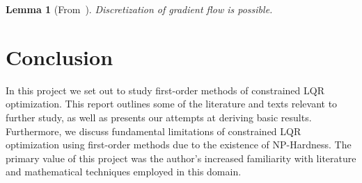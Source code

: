 \documentclass[11pt]{article}  %
\newtheorem{lemma}[theorem]{Lemma}
\begin{document}
\begin{lemma}[From~\cite{bu2019lqr}]
  Discretization of gradient flow is possible.
\end{lemma}


\section{Conclusion}
\label{sec:conclusion}

In this project we set out to study first-order methods of
constrained LQR optimization.
This report outlines some of the literature and texts relevant
to further study,
as well as presents our attempts at deriving basic results.
Furthermore, we discuss fundamental limitations of constrained
LQR optimization using first-order methods
due to the existence of NP-Hardness.
The primary value of this project was the author's
increased familiarity with literature and mathematical techniques
employed in this domain.





\end{document}
